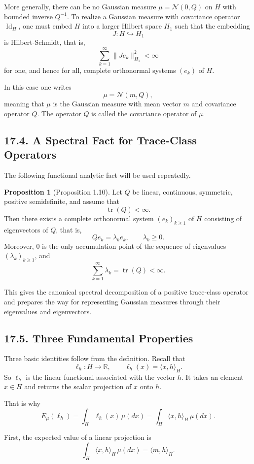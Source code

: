 \documentclass[11pt]{article}
\theoremstyle{definition}
\newtheorem{proposition}{Proposition}
\theoremstyle{remark}
\begin{document}
More generally, there can be no Gaussian measure $\mu=\mathcal N(0,Q)$ on $H$ with bounded inverse $Q^{-1}$. To realize a Gaussian measure with covariance operator $\operatorname{Id}_H$, one must embed $H$ into a larger Hilbert space $H_1$ such that the embedding
\[
J:H\hookrightarrow H_1
\]
is Hilbert-Schmidt, that is,
\[
\sum_{k=1}^{\infty}\|Je_k\|_{H_1}^2<\infty
\]
for one, and hence for all, complete orthonormal systems $(e_k)$ of $H$.

In this case one writes
\[
\mu=\mathcal N(m,Q),
\]
meaning that $\mu$ is the Gaussian measure with mean vector $m$ and covariance operator $Q$. The operator $Q$ is called the covariance operator of $\mu$.

\subsection*{17.4. A Spectral Fact for Trace-Class Operators}
The following functional analytic fact will be used repeatedly.

\begin{proposition}[Proposition 1.10]
Let $Q$ be linear, continuous, symmetric, positive semidefinite, and assume that
\[
\operatorname{tr}(Q)<\infty.
\]
Then there exists a complete orthonormal system $(e_k)_{k\ge 1}$ of $H$ consisting of eigenvectors of $Q$, that is,
\[
Qe_k=\lambda_k e_k,
\qquad
\lambda_k\ge 0.
\]
Moreover, $0$ is the only accumulation point of the sequence of eigenvalues $(\lambda_k)_{k\ge 1}$, and
\[
\sum_{k=1}^{\infty}\lambda_k=\operatorname{tr}(Q)<\infty.
\]
\end{proposition}

This gives the canonical spectral decomposition of a positive trace-class operator and prepares the way for representing Gaussian measures through their eigenvalues and eigenvectors.

\subsection*{17.5. Three Fundamental Properties}
Three basic identities follow from the definition.
Recall that
\[
\ell_h:H\to\mathbb R,\qquad \ell_h(x)=\langle x,h\rangle_H.
\]
So $\ell_h$ is the linear functional associated with the vector $h$. It takes an element $x\in H$ and returns the scalar projection of $x$ onto $h$.

That is why
\[
E_\mu(\ell_h)
=
\int_H \ell_h(x)\,\mu(dx)
=
\int_H \langle x,h\rangle_H\,\mu(dx).
\]

First, the expected value of a linear projection is
\[
\int_H \langle x,h\rangle_H\,\mu(dx)=\langle m,h\rangle_H.
\]
\end{document}
